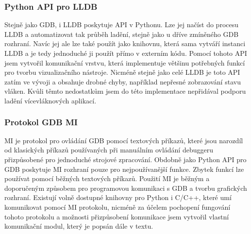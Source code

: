 \documentclass[bc,male,python,dept460]{diploma}						%
\begin{document}
		\subsubsection{Python API pro LLDB}
		Stejně jako GDB, i LLDB poskytuje API v Pythonu. Lze jej načíst do procesu LLDB a automatizovat tak průběh ladění, stejně jako u dříve zmíněného GDB
		rozhraní. Navíc jej ale lze také použít jako knihovnu, která sama vytváří instanci LLDB a je tedy jednoduché ji použít přímo v externím kódu.
		Pomocí tohoto API jsem vytvořil komunikační vrstvu, která implementuje většinu potřebných funkcí pro tvorbu vizualizačního nástroje.
		Nicméně stejně jako celé LLDB je toto API zatím ve vývoji a obsahuje drobné chyby, například nepřesné zobrazování stavu vláken. Kvůli těmto nedostatkům
		jsem do této implementace nepřidával podporu ladění vícevláknových aplikací.
		
		\subsubsection{Protokol GDB MI}
		MI je protokol pro ovládání GDB pomocí textových příkazů, které jsou narozdíl od klasických příkazů používaných při manuálním ovládání debuggeru
		přizpůsobené pro jednoduché strojové zpracování. Obdobně jako Python API pro GDB poskytuje MI rozhraní pouze pro nejpoužívanější funkce.
		Zbytek funkcí lze používat pomocí běžných textových příkazů. Použití MI je běžným a doporučeným \cite{gdb-mi-usage} způsobem pro programovou komunikaci
		s GDB a tvorbu grafických rozhraní. Existují volně dostupné knihovny pro Python i C/C++, které umí komunikovat pomocí MI protokolu, nicméně za
		účelem pochopení fungování tohoto protokolu a možnosti přizpůsobení komunikace jsem vytvořil vlastní komunikační modul, který je popsán dále v textu.
		
\end{document}
